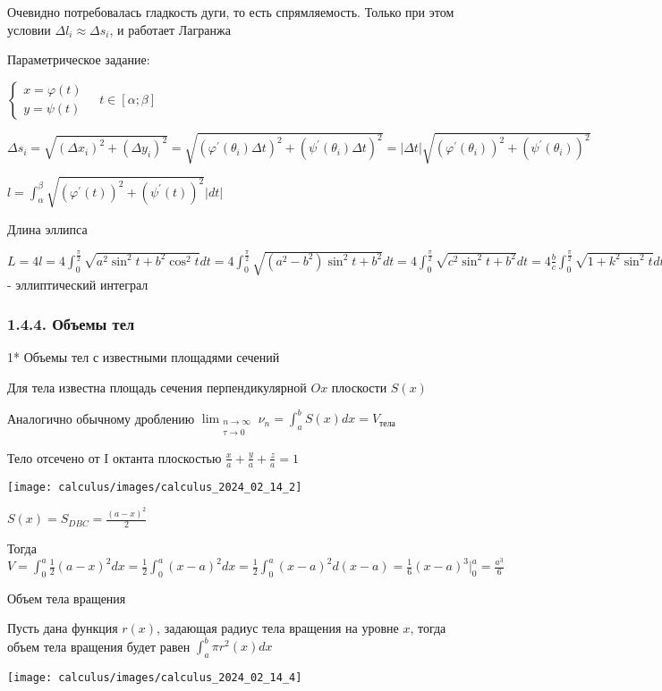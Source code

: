 \documentclass[12pt]{article}
\begin{document}
    \Nota Очевидно потребовалась гладкость дуги, то есть спрямляемость. Только при этом условии $\Delta l_i \approx \Delta s_i$, и работает \Ths Лагранжа

    Параметрическое задание:

    $\begin{cases}x = \varphi(t) \\ y = \psi(t)\end{cases} \quad t \in [\alpha;\beta]$

    $\Delta s_i = \sqrt{(\Delta x_i)^2 + (\Delta y_i)^2} = \sqrt{(\varphi^\prime(\theta_i) \Delta t)^2 + (\psi^\prime(\theta_i) \Delta t)^2} =
    |\Delta t|\sqrt{(\varphi^\prime(\theta_i))^2 + (\psi^\prime(\theta_i))^2}$

    $l = \int^\beta_\alpha \sqrt{(\varphi^\prime(t))^2 + (\psi^\prime(t))^2} |dt|$

    \Ex Длина эллипса

    $L = 4l = 4 \int^\frac{\pi}{2}_0 \sqrt{a^2 \sin^2 t + b^2 \cos^2 t} dt =
    4 \int^\frac{\pi}{2}_0 \sqrt{(a^2 - b^2) \sin^2 t + b^2} dt =
    4 \int^\frac{\pi}{2}_0 \sqrt{c^2 \sin^2 t + b^2} dt = 4 \frac{b}{c} \int^\frac{\pi}{2}_0 \sqrt{1 + k^2 \sin^2 t} dt$ - эллиптический интеграл

    \subsubsection{1.4.4. Объемы тел}

    1* \hypertarget{volumeofbodieswithknownarea}{Объемы тел с известными площадями сечений}

    Для тела известна площадь сечения перпендикулярной $Ox$ плоскости $S(x)$

    Аналогично обычному дроблению $\lim_{\substack{n \to \infty \\ \tau \to 0}} \nu_n = \int^b_a S(x)dx = V_\text{тела}$

    \Ex Тело отсечено от I октанта плоскостью $\frac{x}{a} + \frac{y}{a} + \frac{z}{a} = 1$

    \texttt{[image: calculus/images/calculus\_2024\_02\_14\_2]}

    $S(x) = S_{DBC} = \frac{(a - x)^2}{2}$

    Тогда $V = \int_0^a \frac{1}{2} (a - x)^2 dx = \frac{1}{2} \int_0^a (x - a)^2 dx =
    \frac{1}{2} \int^a_0 (x - a)^2 d(x - a) = \frac{1}{6} (x - a)^3 \Big|^a_0 = \frac{a^3}{6}$

    \Nota \hypertarget{volumeofbodyofrevolution}{Объем тела вращения}

    Пусть дана функция $r(x)$, задающая радиус тела вращения на уровне $x$,
    тогда объем тела вращения будет равен $\int_a^b \pi r^2(x) dx$

    \texttt{[image: calculus/images/calculus\_2024\_02\_14\_4]}
\end{document}
